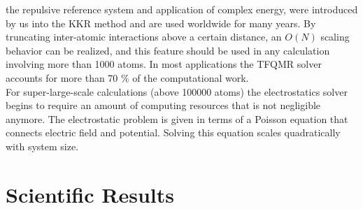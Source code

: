 \documentclass [a4paper, 12pt]{article}
\begin{document}
the repulsive reference system and application of complex energy, were
introduced by us into the KKR method \cite{zeller_application_1982,zeller_theory_1995}
and are used worldwide for many years. 
By truncating inter-atomic interactions above a certain distance, an $O(N)$ scaling 
behavior can be realized, and this feature should be used in any calculation involving more than 1000 atoms.
In most applications the TFQMR solver accounts for more than 70 \% of the computational work.
\\
For super-large-scale calculations (above 100000 atoms) the electrostatics solver begins
to require an amount of computing resources that is not negligible anymore. 
The electrostatic problem is given in terms of a Poisson equation that connects electric field and potential. 
Solving this equation scales quadratically with system size. 

\section{Scientific Results}
\end{document}
